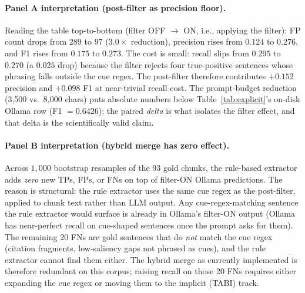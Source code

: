 \documentclass{article}
\begin{document}
\paragraph{Panel A interpretation (post-filter as precision floor).} Reading the table top-to-bottom (filter OFF $\to$ ON, i.e., applying the filter): FP count drops from $289$ to $97$ ($3.0\times$ reduction), precision rises from $0.124$ to $0.276$, and F1 rises from $0.175$ to $0.273$. The cost is small: recall slips from $0.295$ to $0.270$ (a $0.025$ drop) because the filter rejects four true-positive sentences whose phrasing falls outside the cue regex. The post-filter therefore contributes $+0.152$ precision and $+0.098$ F1 at near-trivial recall cost. The prompt-budget reduction (3{,}500 vs.\ 8{,}000 chars) puts absolute numbers below Table~\ref{tab:explicit}'s on-disk Ollama row (F1 $=0.6426$); the paired \emph{delta} is what isolates the filter effect, and that delta is the scientifically valid claim.

\paragraph{Panel B interpretation (hybrid merge has zero effect).} Across $1{,}000$ bootstrap resamples of the 93 gold chunks, the rule-based extractor adds \emph{zero} new TPs, FPs, or FNs on top of filter-ON Ollama predictions. The reason is structural: the rule extractor uses the same cue regex as the post-filter, applied to chunk text rather than LLM output. Any cue-regex-matching sentence the rule extractor would surface is already in Ollama's filter-ON output (Ollama has near-perfect recall on cue-shaped sentences once the prompt asks for them). The remaining 20 FNs are gold sentences that do \emph{not} match the cue regex (citation fragments, low-saliency gaps not phrased as cues), and the rule extractor cannot find them either. The hybrid merge as currently implemented is therefore redundant on this corpus; raising recall on those 20 FNs requires either expanding the cue regex or moving them to the implicit (TABI) track.
\end{document}
